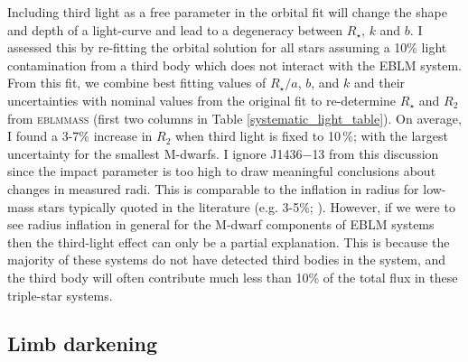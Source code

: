 Including third light as a free parameter in the orbital fit will change the shape and depth of a light-curve and lead to a degeneracy between $R_{\star}$, $k$ and $b$.  I assessed this by re-fitting the orbital solution for all stars assuming a 10\% light contamination from a third body which does not interact with the EBLM system. From this fit, we combine best fitting values of  $R_{\star}/a$, $b$, and $k$ and their uncertainties with nominal values from the original fit to re-determine $R_{\star}$ and $R_{2}$ from \textsc{eblmmass} (first two columns in Table \ref{systematic_light_table}). On average, I found a 3-7\% increase in $R_2$ when third light is fixed to 10\,\%; with the largest uncertainty for the smallest M-dwarfs. I ignore J1436$-$13 from this discussion since the impact parameter is too high to draw meaningful conclusions about changes in measured radi. This is comparable to the inflation in radius for low-mass stars typically quoted in the literature (e.g.  3-5\%; \citealt{2013ApJ...776...87S}). However, if we were to see radius inflation in general for the M-dwarf components of EBLM systems then the third-light effect can only be a partial explanation. This is because the majority of these systems do not have detected third bodies in the system, and the third body will often contribute much less than 10\% of the total flux in these triple-star systems. 



\subsection{Limb darkening}\label{limb_darkening_section}



